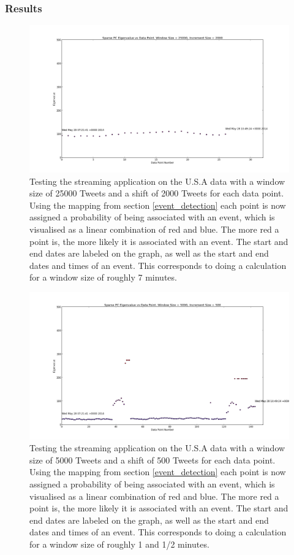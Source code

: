 \documentclass[11pt,a4paper]{article}
\begin{document}
\subsubsection{Results}
\begin{figure}[H]
\centering
\includegraphics[scale=0.25]{Testing_Streaming_App_25000_2000_USA.png}
\caption{Testing the streaming application on the U.S.A data with a window size of 25000 Tweets and a shift of 2000 Tweets for each data point. Using the mapping from section \ref{event_detection} each point is now assigned a probability of being associated with an event, which is visualised as a linear combination of red and blue. The more red a point is, the more likely it is associated with an event. The start and end dates are labeled on the graph, as well as the start and end dates and times of an event. This corresponds to doing a calculation for a window size of roughly 7 minutes.}
\label{testing_app_25000_usa}
\end{figure}

\begin{figure}[H]
\centering
\includegraphics[scale=0.25]{Testing_Streaming_App_5000_500_USA.png}
\caption{Testing the streaming application on the U.S.A data with a window size of 5000 Tweets and a shift of 500 Tweets for each data point. Using the mapping from section \ref{event_detection} each point is now assigned a probability of being associated with an event, which is visualised as a linear combination of red and blue. The more red a point is, the more likely it is associated with an event. The start and end dates are labeled on the graph, as well as the start and end dates and times of an event. This corresponds to doing a calculation for a window size of roughly 1 and 1/2 minutes.}
\label{testing_app_5000_usa}
\end{figure}
\end{document}
